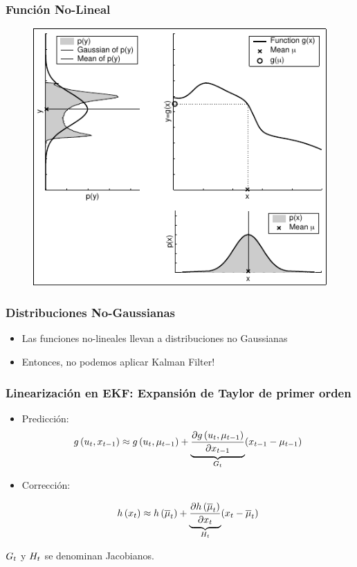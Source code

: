 \begin{frame}
	\frametitle{Función No-Lineal}
	
	\begin{figure}[!h]
		\includegraphics[width=0.5\columnwidth]{./images/nonlinear_transformation_of_a_gaussian.pdf}
	\end{figure}
\end{frame}


\begin{frame}
	\frametitle{Distribuciones No-Gaussianas}
	
	
	\begin{itemize}
		\item Las funciones no-lineales llevan a distribuciones no Gaussianas
		\item Entonces, no podemos aplicar Kalman Filter!
	\end{itemize}
	
\end{frame}

\begin{frame}
	\frametitle{Linearización en EKF: Expansión de Taylor de primer orden}
	
	
	\begin{itemize}
		\item Predicción:
		\begin{equation*}
			g\left( u_{t}, x_{t-1} \right) \approx g\left( u_{t}, \mu_{t-1} \right) + \underbrace{\dfrac{\partial g\left( u_{t}, \mu_{t-1} \right)}{\partial x_{t-1}}}_{G_{t}} (x_{t-1} - \mu_{t-1}) 
		\end{equation*}
			
		\item Corrección:
		
		\begin{equation*}
			h\left( x_{t} \right) \approx h\left( \overline{\mu}_{t} \right) + \underbrace{\dfrac{\partial h\left( \overline{\mu}_{t} \right)}{\partial x_{t}}}_{H_{t}} (x_{t} - \overline{\mu}_{t})
		\end{equation*}
		
	\end{itemize}
	
	$G_{t}$ y $H_{t}$ se denominan Jacobianos.
\end{frame}

